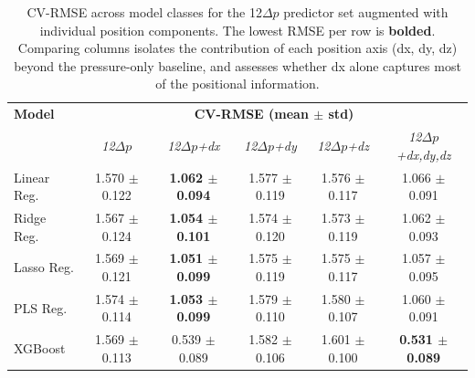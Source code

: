         \begin{table}[htbp]
        \centering
        \captionsetup{font=footnotesize}
        \caption{CV-RMSE across model classes for the 12$\Delta p$ predictor set augmented with individual position components. The lowest RMSE per row is \textbf{bolded}. Comparing columns isolates the contribution of each position axis (dx, dy, dz) beyond the pressure-only baseline, and assesses whether dx alone captures most of the positional information.}
        \footnotesize
        \setlength{\tabcolsep}{5pt}
        \renewcommand{\arraystretch}{1.2}
        \begin{tabular}{l|ccccc}
        \hline\hline
        \textbf{Model} & \multicolumn{5}{c}{\textbf{CV-RMSE (mean $\pm$ std)}} \\
         & \textit{12$\Delta p$} & \textit{12$\Delta p$+dx} & \textit{12$\Delta p$+dy} & \textit{12$\Delta p$+dz} & \textit{12$\Delta p$+dx,dy,dz} \\
        \hline
        Linear Reg. & 1.570 $\pm$ 0.122 & \textbf{1.062 $\pm$ 0.094} & 1.577 $\pm$ 0.119 & 1.576 $\pm$ 0.117 & 1.066 $\pm$ 0.091 \\
        Ridge Reg. & 1.567 $\pm$ 0.124 & \textbf{1.054 $\pm$ 0.101} & 1.574 $\pm$ 0.120 & 1.573 $\pm$ 0.119 & 1.062 $\pm$ 0.093 \\
        Lasso Reg. & 1.569 $\pm$ 0.121 & \textbf{1.051 $\pm$ 0.099} & 1.575 $\pm$ 0.119 & 1.575 $\pm$ 0.117 & 1.057 $\pm$ 0.095 \\
        PLS Reg. & 1.574 $\pm$ 0.114 & \textbf{1.053 $\pm$ 0.099} & 1.579 $\pm$ 0.110 & 1.580 $\pm$ 0.107 & 1.060 $\pm$ 0.091 \\
        XGBoost & 1.569 $\pm$ 0.113 & 0.539 $\pm$ 0.089 & 1.582 $\pm$ 0.106 & 1.601 $\pm$ 0.100 & \textbf{0.531 $\pm$ 0.089} \\
        \hline
        \end{tabular}
        \label{tab:position_sensitivity}
        \end{table}

